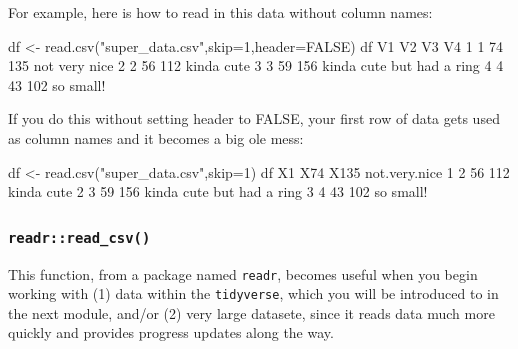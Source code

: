 \documentclass[
]{book}
\newenvironment{Shaded}{\begin{snugshade}}{\end{snugshade}}
\newcommand{\AttributeTok}[1]{\textcolor[rgb]{0.77,0.63,0.00}{#1}}
\newcommand{\ConstantTok}[1]{\textcolor[rgb]{0.00,0.00,0.00}{#1}}
\newcommand{\DecValTok}[1]{\textcolor[rgb]{0.00,0.00,0.81}{#1}}
\newcommand{\FunctionTok}[1]{\textcolor[rgb]{0.00,0.00,0.00}{#1}}
\newcommand{\NormalTok}[1]{#1}
\newcommand{\OtherTok}[1]{\textcolor[rgb]{0.56,0.35,0.01}{#1}}
\newcommand{\SpecialCharTok}[1]{\textcolor[rgb]{0.00,0.00,0.00}{#1}}
\newcommand{\StringTok}[1]{\textcolor[rgb]{0.31,0.60,0.02}{#1}}
\begin{document}
For example, here is how to read in this data without column names:

\begin{Shaded}
\begin{Highlighting}[]
\NormalTok{df }\OtherTok{\textless{}{-}} \FunctionTok{read.csv}\NormalTok{(}\StringTok{"super\_data.csv"}\NormalTok{,}\AttributeTok{skip=}\DecValTok{1}\NormalTok{,}\AttributeTok{header=}\ConstantTok{FALSE}\NormalTok{)}
\NormalTok{df}
\NormalTok{  V1 V2  V3                        V4}
\DecValTok{1}  \DecValTok{1} \DecValTok{74} \DecValTok{135}\NormalTok{             not very nice}
\DecValTok{2}  \DecValTok{2} \DecValTok{56} \DecValTok{112}\NormalTok{                kinda cute}
\DecValTok{3}  \DecValTok{3} \DecValTok{59} \DecValTok{156}\NormalTok{ kinda cute but had a ring}
\DecValTok{4}  \DecValTok{4} \DecValTok{43} \DecValTok{102}\NormalTok{                 so small}\SpecialCharTok{!}
\end{Highlighting}
\end{Shaded}

If you do this without setting header to FALSE, your first row of data gets used as column names and it becomes a big ole mess:

\begin{Shaded}
\begin{Highlighting}[]
\NormalTok{df }\OtherTok{\textless{}{-}} \FunctionTok{read.csv}\NormalTok{(}\StringTok{"super\_data.csv"}\NormalTok{,}\AttributeTok{skip=}\DecValTok{1}\NormalTok{)}
\NormalTok{df}
\NormalTok{  X1 X74 X135             not.very.nice}
\DecValTok{1}  \DecValTok{2}  \DecValTok{56}  \DecValTok{112}\NormalTok{                kinda cute}
\DecValTok{2}  \DecValTok{3}  \DecValTok{59}  \DecValTok{156}\NormalTok{ kinda cute but had a ring}
\DecValTok{3}  \DecValTok{4}  \DecValTok{43}  \DecValTok{102}\NormalTok{                 so small}\SpecialCharTok{!}
\end{Highlighting}
\end{Shaded}

\hypertarget{readrread_csv}{%
\subsubsection*{\texorpdfstring{\texttt{readr::read\_csv()}}{readr::read\_csv()}}\label{readrread_csv}}

This function, from a package named \texttt{readr}, becomes useful when you begin working with (1) data within the \texttt{tidyverse}, which you will be introduced to in the next module, and/or (2) very large datasete, since it reads data much more quickly and provides progress updates along the way.
\end{document}
